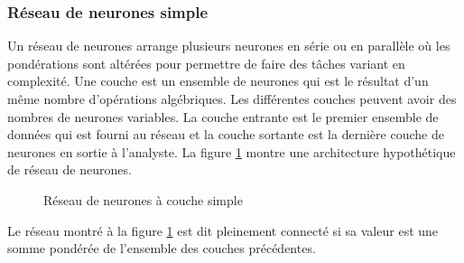     \subsubsection{Réseau de neurones simple}
      Un réseau de neurones arrange plusieurs neurones en série ou en parallèle où les pondérations sont altérées pour permettre de faire des tâches variant en complexité. Une couche est un ensemble de neurones qui est le résultat d'un même nombre d'opérations algébriques. Les différentes couches peuvent avoir des nombres de neurones variables. La couche entrante est le premier ensemble de données qui est fourni au réseau et la couche sortante est la dernière couche de neurones en sortie à l'analyste. La figure \ref{fig:perceptron} montre une architecture hypothétique de réseau de neurones.\par
      \begin{figure}[!h]
        \centering
        \caption{Réseau de neurones à couche simple}
        \label{fig:perceptron}
      \end{figure}
      Le réseau montré à la figure \ref{fig:perceptron} est dit pleinement connecté si sa valeur est une somme pondérée de l'ensemble des couches précédentes. 
      \FloatBarrier
